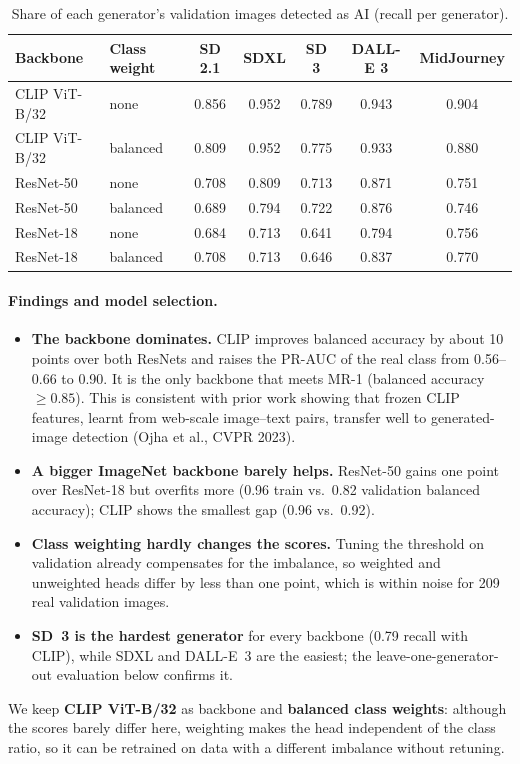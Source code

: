 \documentclass[11pt]{article}
\begin{document}
\begin{table}[h]
\centering
\small
\begin{tabular}{@{}llccccc@{}}
\toprule
\textbf{Backbone} & \textbf{Class weight} & \textbf{SD 2.1} & \textbf{SDXL} & \textbf{SD 3} & \textbf{DALL-E 3} & \textbf{MidJourney} \\
\midrule
CLIP ViT-B/32 & none & 0.856 & 0.952 & 0.789 & 0.943 & 0.904 \\
CLIP ViT-B/32 & balanced & 0.809 & 0.952 & 0.775 & 0.933 & 0.880 \\
ResNet-50 & none & 0.708 & 0.809 & 0.713 & 0.871 & 0.751 \\
ResNet-50 & balanced & 0.689 & 0.794 & 0.722 & 0.876 & 0.746 \\
ResNet-18 & none & 0.684 & 0.713 & 0.641 & 0.794 & 0.756 \\
ResNet-18 & balanced & 0.708 & 0.713 & 0.646 & 0.837 & 0.770 \\
\bottomrule
\end{tabular}
\caption{Share of each generator's validation images detected as AI (recall per generator).}
\label{tab:per-generator}
\end{table}

\paragraph{Findings and model selection.}
\begin{itemize}[nosep,leftmargin=1.4em]
  \item \textbf{The backbone dominates.} CLIP improves balanced accuracy by about 10 points over both ResNets and raises the PR-AUC of the real class from 0.56--0.66 to 0.90. It is the only backbone that meets MR-1 (balanced accuracy $\geq 0.85$). This is consistent with prior work showing that frozen CLIP features, learnt from web-scale image--text pairs, transfer well to generated-image detection (Ojha et al., CVPR 2023).
  \item \textbf{A bigger ImageNet backbone barely helps.} ResNet-50 gains one point over ResNet-18 but overfits more (0.96 train vs.\ 0.82 validation balanced accuracy); CLIP shows the smallest gap (0.96 vs.\ 0.92).
  \item \textbf{Class weighting hardly changes the scores.} Tuning the threshold on validation already compensates for the imbalance, so weighted and unweighted heads differ by less than one point, which is within noise for 209 real validation images.
  \item \textbf{SD~3 is the hardest generator} for every backbone (0.79 recall with CLIP), while SDXL and DALL-E~3 are the easiest; the leave-one-generator-out evaluation below confirms it.
\end{itemize}
We keep \textbf{CLIP ViT-B/32} as backbone and \textbf{balanced class weights}: although the scores barely differ here, weighting makes the head independent of the class ratio, so it can be retrained on data with a different imbalance without retuning.
\end{document}
